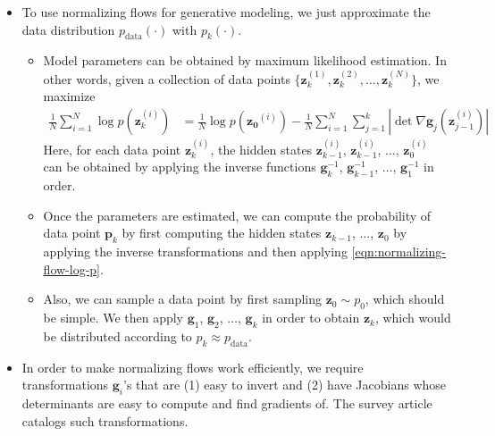 \documentclass[10pt]{article}
\newcommand{\ve}[1]{\mathbf{#1}}
\newcommand{\mrm}[1]{\mathrm{#1}}
\begin{document}
\begin{itemize}
  \item To use normalizing flows for generative modeling, we just approximate the data distribution $p_{\mrm{data}}(\cdot)$ with $p_k(\cdot)$.
  \begin{itemize}    
    \item Model parameters can be obtained by maximum likelihood estimation. In other words, given a collection of data points $\{ \ve{z}^{(1)}_k, \ve{z}^{(2)}_k, \dotsc, \ve{z}^{(N)}_k \}$, we maximize
    \begin{align*}
      \frac{1}{N}\sum_{i=1}^N \log p(\ve{z}_k^{(i)})
      &= \frac{1}{N} \log p(\ve{z_0}^{(i)}) - \frac{1}{N} \sum_{i=1}^N \sum_{j=1}^k |\det \nabla \ve{g}_j(\ve{z}^{(i)}_{j-1}) |
    \end{align*}
    Here, for each data point $\ve{z}_k^{(i)}$, the hidden states $\ve{z}_{k-1}^{(i)}$, $\ve{z}_{k-1}^{(i)}$, $\dotsc$, $\ve{z}_{0}^{(i)}$ can be obtained by applying the inverse functions $\ve{g}^{-1}_k$, $\ve{g}^{-1}_{k-1}$, $\dotsc$, $\ve{g}^{-1}_1$ in order.

    \item Once the parameters are estimated, we can compute the probability of data point $\ve{p}_k$ by first computing the hidden states $\ve{z}_{k-1}$, $\dotsc$, $\ve{z}_0$ by applying the inverse transformations and then applying \eqref{eqn:normalizing-flow-log-p}.
    
    \item Also, we can sample a data point by first sampling $\ve{z}_0 \sim p_0$, which should be simple. We then apply $\ve{g}_1$, $\ve{g}_2$, $\dotsc$, $\ve{g}_k$ in order to obtain $\ve{z}_k$, which would be distributed according to $p_k \approx p_{\mrm{data}}$.    
  \end{itemize}

  \item In order to make normalizing flows work efficiently, we require transformations $\ve{g}_i$'s that are (1) easy to invert and (2) have Jacobians whose determinants are easy to compute and find gradients of. The survey article \cite{Kobyzev:2021} catalogs such transformations.
\end{itemize}
\end{document}

